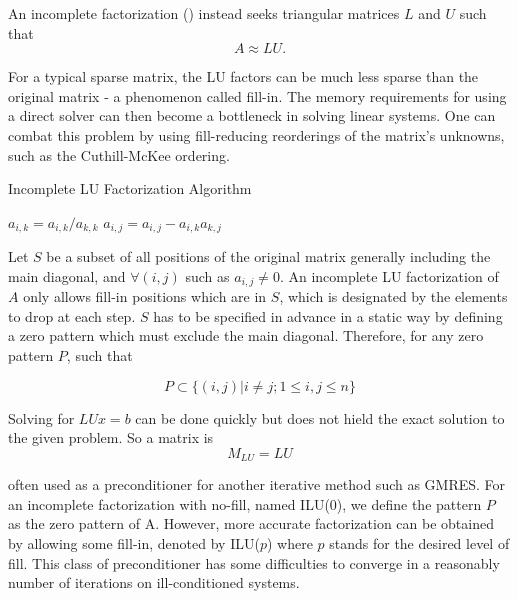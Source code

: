 An incomplete factorization (\cite{saad1994ilut,sertel2000incomplete, lee2003incomplete,malas2007incomplete}) instead seeks triangular matrices $L$ and $U$ such that 
\[A \approx LU.\]

For a typical sparse matrix, the LU factors can be much less sparse than the original matrix - a phenomenon called fill-in. The memory requirements for using a direct solver can then become a bottleneck in solving linear systems. One can combat this problem by using fill-reducing reorderings of the matrix's unknowns, such as the Cuthill-McKee ordering. 

\begin{algorithm}[htbp]
	\caption{Incomplete LU Factorization Algorithm}
	\label{alg:ilu}
	\begin{algorithmic}[1]
					\State $a_{i,k} = a_{i,k}/a_{k,k}$
							\State $a_{i,j} = a_{i,j}-a_{i,k}a_{k,j}$
						\EndIf
					\EndFor
				\EndIf
			\EndFor
		\EndFor
	\end{algorithmic}
\end{algorithm}

Let $S$ be a subset of all positions of the original matrix generally including the main diagonal, and $\forall (i, j)$ such as $a_{i,j} \neq 0$. An incomplete LU factorization of $A$ only allows fill-in positions which are in $S$, which is designated by the elements to drop at each step. $S$ has to be specified in advance in a static way by defining a zero pattern which must exclude the main diagonal. Therefore, for any zero pattern $P$, such that

\begin{equation}
	P \subset \{ (i,j) | i \neq j; 1 \leq i,j\leq n\}
\end{equation}


Solving for $LUx=b$ can be done quickly but does not hield the exact solution to the given problem. So a matrix is \[M_{LU} = LU\]

often used as a preconditioner for another iterative method such as GMRES. For an incomplete factorization with no-fill, named ILU(0), we define the pattern $P$ as the zero pattern of A. However, more accurate factorization can be obtained by allowing some fill-in, denoted by ILU($p$) where $p$ stands for the desired level of fill. This class of preconditioner has some difficulties to converge in a reasonably number of iterations on ill-conditioned systems.

